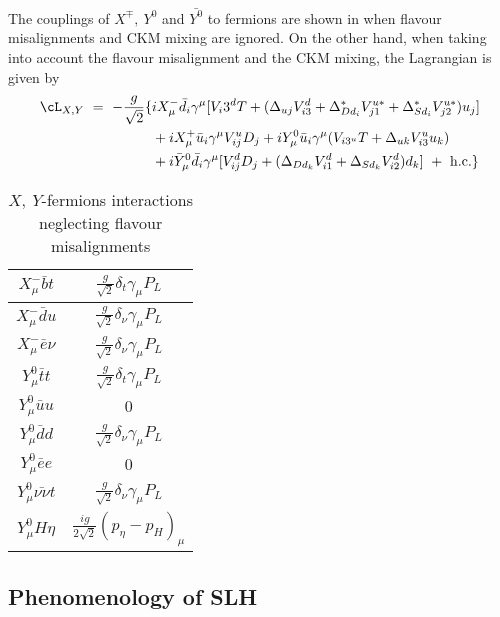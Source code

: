 The couplings of $X^\mp,~Y^0$ and $\bar{Y^0}$ to fermions are shown in  when flavour misalignments and CKM mixing are ignored.
On the other hand, when taking into account the flavour misalignment and the CKM mixing, 
the Lagrangian is given by
\begin{align}
 \cL_{X,Y}~=~ -\frac{g}{\sqrt{2}}\huge{\{} &iX_\mu^- \bar{d}_i\gamma^\mu [V_i3^d T + (\Delta_{uj}V_{i3}^d + \Delta_{Dd_i}^* V_{j1}^{u*} + \Delta_{Sd_i}^* V_{j2}^{u*})u_j] \nonumber \\ 
 & +iX_\mu^+ \bar{u}_i\gamma^\mu V_{ij}^u D_j + i Y_\mu^{0} \bar{u}_i\gamma^\mu (V_{i3^u} T + \Delta_{uk} V_{i3}^u u_k) \nonumber \\ 
 & +i \bar{Y}_\mu^0\bar{d}_i\gamma^\mu [V_{ij}^d D_j + (\Delta_{Dd_k}V_{i1}^d +\Delta_{Sd_k}V_{i2}^d)d_k  ]~ +~{\rm{h.c.}} \huge{\}}
\end{align}
        
        
\begin{table} %
\begin{center}
  \begin{tabular}{| c | c | }
    \hline
    $X_\mu^-\bar{b}t$ &$\frac{g}{\sqrt{2}} \delta_t \gamma_\mu P_L $ \\ \hline
    $X_\mu^-\bar{d}u$ &$\frac{g}{\sqrt{2}} \delta_\nu \gamma_\mu P_L $ \\ \hline
    $X_\mu^-\bar{e}\nu$ &$\frac{g}{\sqrt{2}} \delta_\nu \gamma_\mu P_L $ \\ \hline    
        $Y_\mu^0\bar{t}t$ &$\frac{g}{\sqrt{2}} \delta_t \gamma_\mu P_L $ \\ \hline
    $Y_\mu^0\bar{u}u$ &$0$ \\ \hline
    $Y_\mu^0\bar{d}d$ &$\frac{g}{\sqrt{2}} \delta_\nu \gamma_\mu P_L $ \\ \hline
    $Y_\mu^0\bar{e}e$ &$0$ \\ \hline
    $Y_\mu^0\bar{\nu\nu}t$ &$\frac{g}{\sqrt{2}} \delta_\nu \gamma_\mu P_L $ \\ \hline
    $Y_\mu^0H\eta$ &$\frac{ig}{2\sqrt{2}} (p_\eta - p_H)_\mu $ \\ \hline
  \end{tabular}
  \caption{$X,~Y$-fermions interactions neglecting flavour misalignments}
  \label{tab:XYff}
\end{center}
 \end{table}
        


\subsection{Phenomenology of SLH}
